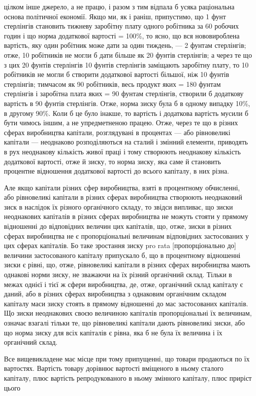 цілком інше джерело, а не працю, і разом з тим відпала б
усяка раціональна основа політичної економії. Якщо ми, як і раніш, припустимо, що 1 фунт стерлінгів
становить тижневу заробітну плату одного робітника за 60 робочих годин і що норма
додаткової вартості = 100\%, то ясно, що вся нововироблена
вартість, яку один робітник може дати за один тиждень, — 2 фунтам стерлінгів; отже, 10 робітників не
могли б дати більше як
20 фунтів стерлінгів; а через те що з цих 20 фунтів стерлінгів
10 фунтів стерлінгів заміщають заробітну плату, то 10 робітників не могли б створити додаткової
вартості більшої, ніж
10 фунтів стерлінгів; тимчасом як 90 робітників, весь продукт
яких = 180 фунтам стерлінгів і заробітна плата яких = 90 фунтам стерлінгів, створили б додаткову
вартість в 90 фунтів стерлінгів. Отже, норма зиску була б в одному випадку 10\%, в другому 90\%. Коли
б це було інакше, то вартість і додаткова
вартість мусили б бути чимось іншим, а не упредметненою
працею. Отже, через те що в різних сферах виробництва капітали, розглядувані в процентах — або
рівновеликі капітали —
неоднаково розподіляються на сталий і змінний елементи, приводять в рух неоднакову кількість живої
праці і тому створюють
неоднакову кількість додаткової вартості, отже й зиску, то
норма зиску, яка саме й становить процентне відношення додаткової вартості до всього капіталу, в них
різна.

Але якщо капітали різних сфер виробництва, взяті в процентному обчисленні, або рівновеликі капітали
в різних сферах
виробництва створюють неоднаковий зиск в наслідок їх різного
органічного складу, то звідси випливає, що зиски неоднакових
капіталів в різних сферах виробництва не можуть стояти у
прямому відношенні до відповідних величин цих капіталів,
що, отже, зиски в різних сферах виробництва не є пропорціональні величинам відповідних застосованих
у цих сферах капіталів. Бо таке зростання зиску pro rata [пропорціонально до] величини застосованого
капіталу припускало б, що в процентному відношенні зиски є рівні, що, отже, рівновеликі капітали
в різних сферах виробництва мають однакові норми зиску, не
зважаючи на їх різний органічний склад. Тільки в межах однієї
і тієї ж сфери виробництва, де, отже, органічний склад капіталу є даний, або в різних сферах
виробництва з однаковим
органічним складом капіталу маси зиску стоять в прямому відношенні до мас застосованих капіталів. Що
зиски неоднакових
своєю величиною капіталів пропорціональні їх величинам, означає
взагалі тільки те, що рівновеликі капітали дають рівновеликі
зиски, або що норма зиску для всіх капіталів є рівна, яка б
не була їх величина і їх органічний склад.

Все вищевикладене має місце при тому припущенні, що товари продаються по їх вартостях. Вартість
товару дорівнює
вартості вміщеного в ньому сталого капіталу, плюс вартість
репродукованого в ньому змінного капіталу, плюс приріст цього
